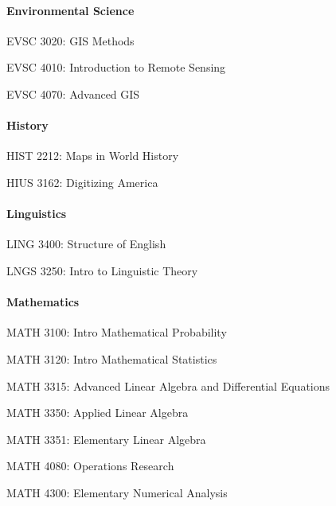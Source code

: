 \paragraph{Environmental Science}
\begin{itemlist}
\item EVSC 3020: GIS Methods
\item EVSC 4010: Introduction to Remote Sensing
\item EVSC 4070: Advanced GIS
\end{itemlist}


\paragraph{History}
\begin{itemlist}
\item HIST 2212: Maps in World History
\item HIUS 3162: Digitizing America
\end{itemlist}


\paragraph{Linguistics}
\begin{itemlist}
\item LING 3400: Structure of English
\item LNGS 3250: Intro to Linguistic Theory
\end{itemlist}

\paragraph{Mathematics}
\begin{itemlist}
\item MATH 3100: Intro Mathematical Probability
\item MATH 3120: Intro Mathematical Statistics
\item MATH 3315: Advanced Linear Algebra and Differential Equations
\item MATH 3350: Applied Linear Algebra
\item MATH 3351: Elementary Linear Algebra
\item MATH 4080: Operations Research
\item MATH 4300: Elementary Numerical Analysis
\end{itemlist}

